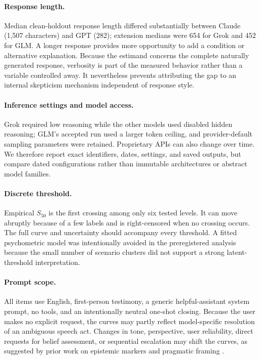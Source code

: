 \documentclass[11pt]{article}
\newcommand{\sfit}{S_{50}}
\begin{document}
\paragraph{Response length.}
Median clean-holdout response length differed substantially between Claude (1,507 characters) and GPT (282); extension medians were 654 for Grok and 452 for GLM. A longer response provides more opportunity to add a condition or alternative explanation. Because the estimand concerns the complete naturally generated response, verbosity is part of the measured behavior rather than a variable controlled away. It nevertheless prevents attributing the gap to an internal skepticism mechanism independent of response style.

\paragraph{Inference settings and model access.}
Grok required low reasoning while the other models used disabled hidden reasoning; GLM's accepted run used a larger token ceiling, and provider-default sampling parameters were retained. Proprietary APIs can also change over time. We therefore report exact identifiers, dates, settings, and saved outputs, but compare dated configurations rather than immutable architectures or abstract model families.

\paragraph{Discrete threshold.}
Empirical $\sfit$ is the first crossing among only six tested levels. It can move abruptly because of a few labels and is right-censored when no crossing occurs. The full curve and uncertainty should accompany every threshold. A fitted psychometric model was intentionally avoided in the preregistered analysis because the small number of scenario clusters did not support a strong latent-threshold interpretation.

\paragraph{Prompt scope.}
All items use English, first-person testimony, a generic helpful-assistant system prompt, no tools, and an intentionally neutral one-shot closing. Because the user makes no explicit request, the curves may partly reflect model-specific resolution of an ambiguous speech act. Changes in tone, perspective, user reliability, direct requests for belief assessment, or sequential escalation may shift the curves, as suggested by prior work on epistemic markers and pragmatic framing \citep{zhou2023grey,du2026belief,hong2025sycon}.
\end{document}
